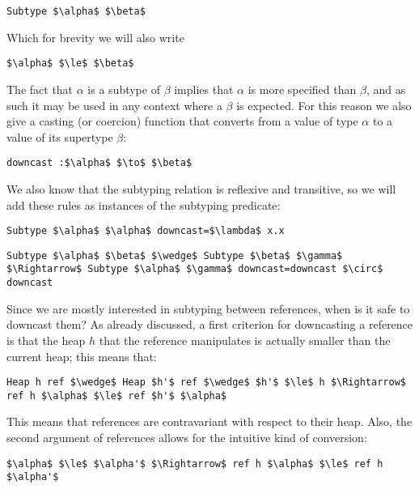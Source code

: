 \documentclass[a4paper]{article}
\begin{document}
\begin{lstlisting}
Subtype $\alpha$ $\beta$
\end{lstlisting}

Which for brevity we will also write

\begin{lstlisting}
$\alpha$ $\le$ $\beta$
\end{lstlisting}
The fact that $\alpha $ is a subtype of $\beta $ implies that $\alpha $ is more specified than $\beta $, and as such it may be used in any context where a $\beta $ is expected. For this reason we also give a casting (or coercion) function that converts from a value of type $\alpha $ to a value of its supertype $\beta $:

\begin{lstlisting}
downcast :$\alpha$ $\to$ $\beta$
\end{lstlisting}
We also know that the subtyping relation is reflexive and transitive, so we will add these rules as instances of the subtyping predicate:

\begin{lstlisting}
Subtype $\alpha$ $\alpha$ downcast=$\lambda$ x.x
\end{lstlisting}

\begin{lstlisting}
Subtype $\alpha$ $\beta$ $\wedge$ Subtype $\beta$ $\gamma$ $\Rightarrow$ Subtype $\alpha$ $\gamma$ downcast=downcast $\circ$ downcast
\end{lstlisting}

Since we are mostly interested in subtyping between references, when is it safe to downcast them? As already discussed, a first criterion for downcasting a reference is that the heap $h$ that the reference manipulates is actually smaller than the current heap; this means that:

\begin{lstlisting}
Heap h ref $\wedge$ Heap $h'$ ref $\wedge$ $h'$ $\le$ h $\Rightarrow$ ref h $\alpha$ $\le$ ref $h'$ $\alpha$
\end{lstlisting}

This means that references are contravariant with respect to their heap. Also, the second argument of references allows for the intuitive kind of conversion:

\begin{lstlisting}
$\alpha$ $\le$ $\alpha'$ $\Rightarrow$ ref h $\alpha$ $\le$ ref h $\alpha'$
\end{lstlisting}
\end{document}
